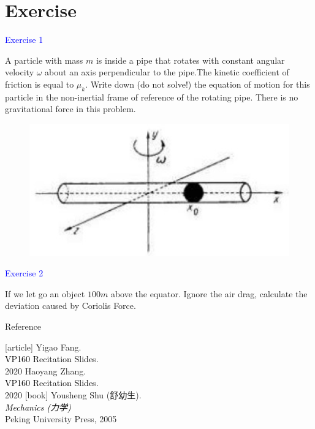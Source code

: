 \documentclass{beamer}
\begin{document}
\section{Exercise}
\begin{frame}
\textcolor{blue}{Exercise 1}

A particle with mass $m$ is inside a pipe that rotates with constant
angular velocity $\omega$ about an axis perpendicular to the pipe.The
kinetic coefficient of friction is equal to $\mu_k$. Write down (do not
solve!) the equation of motion for this particle in the non-inertial
frame of reference of the rotating pipe. There is no gravitational
force in this problem.
\begin{figure}[htbp]
\centering
\includegraphics[width=0.5 \linewidth, angle =0]{ex1.png}
\label{fig:4}
\end{figure}
\end{frame}

\begin{frame}
\textcolor{blue}{Exercise 2}

If we let go an object $100m$ above the equator. Ignore the air
drag, calculate the deviation caused by Coriolis Force.
\end{frame}


\begin{frame}{Reference}
  \begin{thebibliography}{9}
  [article]
   Yigao Fang.\\
  \textcolor{black}{VP160 Recitation Slides.}\\
  2020
   Haoyang Zhang.\\
  \textcolor{black}{VP160 Recitation Slides.}\\
  2020
  [book]
   Yousheng Shu (舒幼生).\\
  \textcolor{black}{\textit{Mechanics (力学)}}\\
  Peking University Press, 2005
  \end{thebibliography}
  \end{frame}
  
\end{document}
